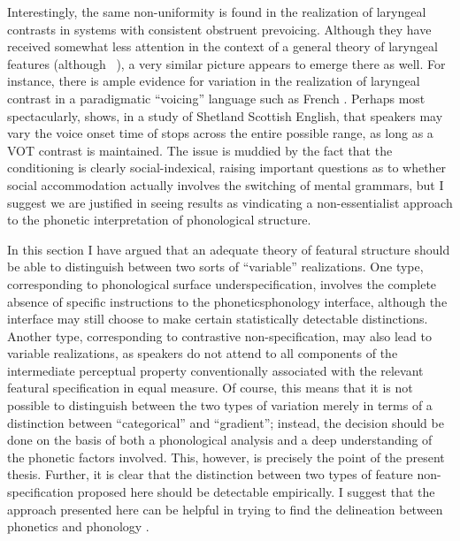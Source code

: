 Interestingly, the same non-uniformity is found in the realization of laryngeal contrasts in systems with consistent obstruent prevoicing. Although they have received somewhat less attention in the context of a general theory of laryngeal features (although \cf\ \citealt{harris09:_why_final_obstr_devoic_is_weaken}), a very similar picture appears to emerge there as well. For instance, there is ample evidence for variation in the realization of laryngeal contrast in a paradigmatic \enquote{voicing} language such as French \citep[\cf \egm][]{temple98:_aspec_frenc,temple00:_old}. Perhaps most spectacularly, \citet{scobbie06:_flexib_englis_vot} shows, in a study of Shetland Scottish English, that speakers may vary the voice onset time of stops across the entire possible range, as long as a VOT contrast is maintained. The issue is muddied by the fact that the conditioning is clearly social\hyp indexical, raising important questions as to whether social accommodation actually involves the switching of mental grammars, but I suggest we are justified in seeing  results as vindicating a non\hyp essentialist approach to the phonetic interpretation of phonological structure.

In this section I have argued that an adequate theory of featural structure should be able to distinguish between two sorts of \enquote{variable} realizations. One type, corresponding to phonological surface underspecification, involves the complete absence of specific instructions to the phonetics\endash phonology interface, although the interface may still choose to make certain statistically detectable distinctions. Another type, corresponding to contrastive non\hyp specification, may also lead to variable realizations, as speakers do not attend to all components of the intermediate perceptual property conventionally associated with the relevant featural specification in equal measure. Of course, this means that it is not possible to distinguish between the two types of variation merely in terms of a distinction between \enquote{categorical} and \enquote{gradient}; instead, the decision should be done on the basis of both a phonological analysis and a deep understanding of the phonetic factors involved. This, however, is precisely the point of the present thesis. Further, it is clear that the distinction between two types of feature non-specification proposed here should be detectable empirically. I suggest that the approach presented here can be helpful in trying to find the delineation between phonetics and phonology \citep{cohn06:_is,scobbie07:_inter}.

